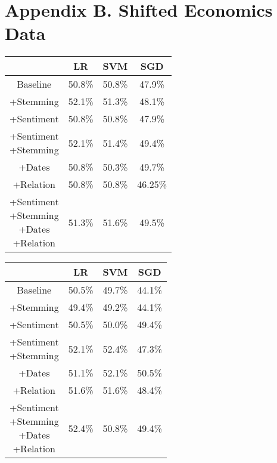 \documentclass[11pt,a4paper]{article}
\begin{document}
\section{Appendix B. Shifted Economics Data}
\begin{center}
\begin{tabular}{ |c|c|c|c| }
 \hline
  & LR & SVM & SGD \\
  \hline
  Baseline & 50.8\% & 50.8\% & 47.9\% \\
  \hline
 +Stemming & 52.1\% & 51.3\% & 48.1\% \\
  \hline
 +Sentiment & 50.8\% & 50.8\% & 47.9\% \\
  \hline
  \shortstack{+Sentiment \\ +Stemming} & 52.1\% & 51.4\% & 49.4\%\\
 \hline
 +Dates & 50.8\% & 50.3\% & 49.7\% \\
  \hline
 +Relation & 50.8\% & 50.8\% & 46.25\% \\
  \hline
  \shortstack{+Sentiment \\ +Stemming \\+Dates \\+Relation} & 51.3\% & 51.6\% & 49.5\% \\
 \hline
\end{tabular}
\end{center}

\begin{center}
\begin{tabular}{ |c|c|c|c| }
 \hline
  & LR & SVM & SGD \\
  \hline
  Baseline & 50.5\% & 49.7\% & 44.1\% \\
  \hline
 +Stemming & 49.4\% & 49.2\% & 44.1\% \\
  \hline
 +Sentiment & 50.5\% & 50.0\% & 49.4\% \\
  \hline
  \shortstack{+Sentiment \\ +Stemming} & 52.1\% & 52.4\% & 47.3\%\\
 \hline
 +Dates & 51.1\% & 52.1\% & 50.5\% \\
  \hline
 +Relation & 51.6\% & 51.6\% & 48.4\% \\
  \hline
  \shortstack{+Sentiment \\ +Stemming \\+Dates \\+Relation} & 52.4\% & 50.8\% & 49.4\% \\
 \hline
\end{tabular}
\end{center}
\end{document}
